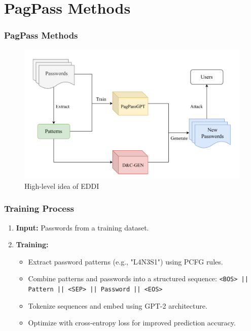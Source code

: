 \documentclass[
	12pt, %
]{beamer}
\begin{document}
\section{PagPass Methods}
\begin{frame}
	\frametitle{PagPass Methods}
	
	\begin{figure}
		\includegraphics[width=0.9\linewidth]{img1.png}
		\caption{High-level idea of EDDI}
		\label{High-level idea of EDDI}
	\end{figure}
\end{frame}




\begin{frame}
	\frametitle{Training Process}
	\begin{enumerate}
		\item \textbf{Input:} Passwords from a training dataset.
		\item \textbf{Training:}
		\begin{itemize}
			\item Extract password patterns (e.g., "L4N3S1") using PCFG rules.
			\item Combine patterns and passwords into a structured sequence:
			\texttt{<BOS> || Pattern || <SEP> || Password || <EOS>}
			\item Tokenize sequences and embed using GPT-2 architecture.
			\item Optimize with cross-entropy loss for improved prediction accuracy.
		\end{itemize}
	\end{enumerate}
\end{frame}
\end{document}
